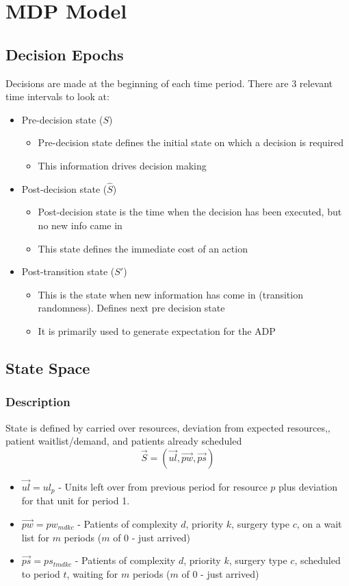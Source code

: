 \section{MDP Model}

\subsection{Decision Epochs}
Decisions are made at the beginning of each time period. There are 3 relevant time intervals to look at:
\begin{itemize}
	\item Pre-decision state ($S$)
	\begin{itemize}
		\item Pre-decision state defines the initial state on which a decision is required
		\item This information drives decision making
	\end{itemize}
	
	\item Post-decision state ($\hat{S}$)
	\begin{itemize}
		\item Post-decision state is the time when the decision has been executed, but no new info came in
		\item This state defines the immediate cost of an action
	\end{itemize} 
	
	\item Post-transition state ($S'$)
	\begin{itemize}
		\item This is the state when new information has come in (transition randomness). Defines next pre decision state
		\item It is primarily used to generate expectation for the ADP
	\end{itemize}
\end{itemize}

\subsection{State Space}
\subsubsection{Description}
State is defined by carried over resources, deviation from expected resources,, patient waitlist/demand, and patients already scheduled
\[  \vec{S}  = (\vec{ul}, \vec{pw}, \vec{ps}) \]
\begin{itemize}
	\item $\vec{ul} = ul_{p}$ - Units left over from previous period for resource $p$ plus deviation for that unit for period 1.
	\item $\vec{pw} = pw_{mdkc}$ - Patients of complexity $d$, priority $k$, surgery type $c$, on a wait list for $m$ periods ($m$ of 0 - just arrived)
	\item $\vec{ps} = ps_{tmdkc}$ - Patients of complexity $d$, priority $k$,  surgery type $c$, scheduled to period $t$, waiting for $m$ periods ($m$ of 0 - just arrived)
\end{itemize}


